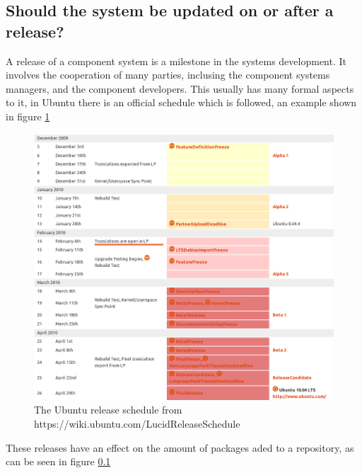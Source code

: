 \subsection{Should the system be updated on or after a release?}
A release of a component system is a milestone in the systems development.
It involves the cooperation of many parties, inclusing the component systems managers, and the component developers.
This usually has many formal aspects to it, in Ubuntu there is an official schedule which is followed, an example shown in figure \ref{ubuntuSchedule}

\begin{figure}[htp]
\begin{center}
  \includegraphics[width=\textwidth]{ubuntusimulationpics/ubunturelease}
  \caption[labelInTOC]{The Ubuntu release schedule from https://wiki.ubuntu.com/LucidReleaseSchedule}
  \label{ubuntuSchedule}
\end{center}
\end{figure}

These releases have an effect on the amount of packages aded to a repository, as can be seen in figure \ref{}

